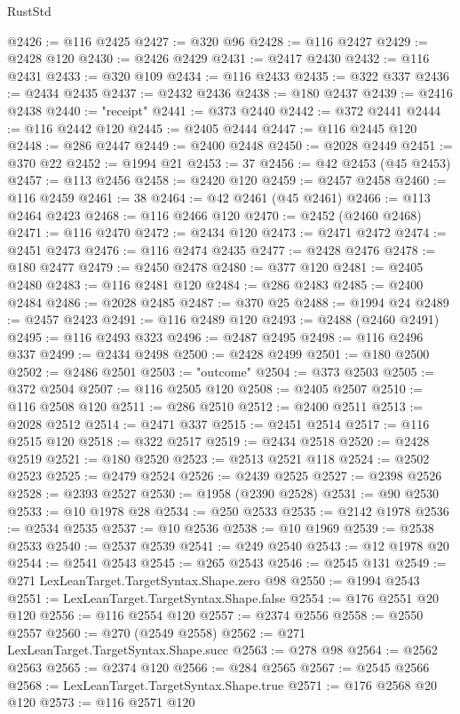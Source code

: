 \begin{lexlean}{RustStd}
\begin{coremodule}
@2426 := @116 @2425
@2427 := @320 @96
@2428 := @116 @2427
@2429 := @2428 @120
@2430 := @2426 @2429
@2431 := @2417 @2430
@2432 := @116 @2431
@2433 := @320 @109
@2434 := @116 @2433
@2435 := @322 @337
@2436 := @2434 @2435
@2437 := @2432 @2436
@2438 := @180 @2437
@2439 := @2416 @2438
@2440 := "receipt"
@2441 := @373 @2440
@2442 := @372 @2441
@2444 := @116 @2442 @120
@2445 := @2405 @2444
@2447 := @116 @2445 @120
@2448 := @286 @2447
@2449 := @2400 @2448
@2450 := @2028 @2449
@2451 := @370 @22
@2452 := @1994 @21
@2453 := 37
@2456 := @42 @2453 (@45 @2453)
@2457 := @113 @2456
@2458 := @2420 @120
@2459 := @2457 @2458
@2460 := @116 @2459
@2461 := 38
@2464 := @42 @2461 (@45 @2461)
@2466 := @113 @2464 @2423
@2468 := @116 @2466 @120
@2470 := @2452 (@2460 @2468)
@2471 := @116 @2470
@2472 := @2434 @120
@2473 := @2471 @2472
@2474 := @2451 @2473
@2476 := @116 @2474 @2435
@2477 := @2428 @2476
@2478 := @180 @2477
@2479 := @2450 @2478
@2480 := @377 @120
@2481 := @2405 @2480
@2483 := @116 @2481 @120
@2484 := @286 @2483
@2485 := @2400 @2484
@2486 := @2028 @2485
@2487 := @370 @25
@2488 := @1994 @24
@2489 := @2457 @2423
@2491 := @116 @2489 @120
@2493 := @2488 (@2460 @2491)
@2495 := @116 @2493 @323
@2496 := @2487 @2495
@2498 := @116 @2496 @337
@2499 := @2434 @2498
@2500 := @2428 @2499
@2501 := @180 @2500
@2502 := @2486 @2501
@2503 := "outcome"
@2504 := @373 @2503
@2505 := @372 @2504
@2507 := @116 @2505 @120
@2508 := @2405 @2507
@2510 := @116 @2508 @120
@2511 := @286 @2510
@2512 := @2400 @2511
@2513 := @2028 @2512
@2514 := @2471 @337
@2515 := @2451 @2514
@2517 := @116 @2515 @120
@2518 := @322 @2517
@2519 := @2434 @2518
@2520 := @2428 @2519
@2521 := @180 @2520
@2523 := @2513 @2521 @118
@2524 := @2502 @2523
@2525 := @2479 @2524
@2526 := @2439 @2525
@2527 := @2398 @2526
@2528 := @2393 @2527
@2530 := @1958 (@2390 @2528)
@2531 := @90 @2530
@2533 := @10 @1978 @28
@2534 := @250 @2533
@2535 := @2142 @1978
@2536 := @2534 @2535
@2537 := @10 @2536
@2538 := @10 @1969
@2539 := @2538 @2533
@2540 := @2537 @2539
@2541 := @249 @2540
@2543 := @12 @1978 @20
@2544 := @2541 @2543
@2545 := @265 @2543
@2546 := @2545 @131
@2549 := @271 LexLeanTarget.TargetSyntax.Shape.zero @98
@2550 := @1994 @2543
@2551 := LexLeanTarget.TargetSyntax.Shape.false
@2554 := @176 @2551 @20 @120
@2556 := @116 @2554 @120
@2557 := @2374 @2556
@2558 := @2550 @2557
@2560 := @270 (@2549 @2558)
@2562 := @271 LexLeanTarget.TargetSyntax.Shape.succ
@2563 := @278 @98
@2564 := @2562 @2563
@2565 := @2374 @120
@2566 := @284 @2565
@2567 := @2545 @2566
@2568 := LexLeanTarget.TargetSyntax.Shape.true
@2571 := @176 @2568 @20 @120
@2573 := @116 @2571 @120

\end{coremodule}
\end{lexlean}
